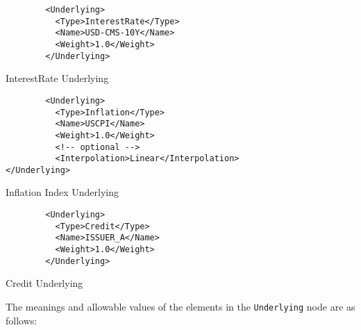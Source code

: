 \begin{listing}[H]
\begin{verbatim}
        <Underlying>
          <Type>InterestRate</Type>
          <Name>USD-CMS-10Y</Name>
          <Weight>1.0</Weight>
        </Underlying>
\end{verbatim}
\caption{InterestRate Underlying}
\label{lst:irunderlying}
\end{listing}

\begin{listing}[H]
\begin{verbatim}
        <Underlying>
          <Type>Inflation</Type>
          <Name>USCPI</Name>
          <Weight>1.0</Weight>
          <!-- optional -->
          <Interpolation>Linear</Interpolation>
</Underlying>
\end{verbatim}
\caption{Inflation Index Underlying}
\label{lst:infunderlying}
\end{listing}

\begin{listing}[H]
\begin{verbatim}
        <Underlying>
          <Type>Credit</Type>
          <Name>ISSUER_A</Name>
          <Weight>1.0</Weight>
        </Underlying>
\end{verbatim}
\caption{Credit Underlying}
\label{lst:crunderlying}
\end{listing}


The meanings and allowable values of the elements in the \lstinline!Underlying! node are as follows:

